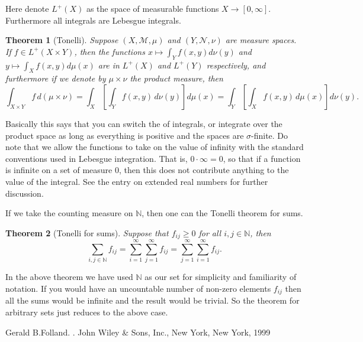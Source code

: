 \documentclass[12pt]{article}
\theoremstyle{theorem}
\newtheorem*{thm}{Theorem}
\theoremstyle{definition}
\theoremstyle{remark}
\begin{document}
Here denote $L^+(X)$ as the space of measurable functions $X \to [0,\infty]$.  Furthermore all integrals are Lebesgue integrals.

\begin{thm}[Tonelli]
Suppose $(X,{\mathcal{M}},\mu)$ and $(Y,{\mathcal{N}},\nu)$ are 
measure spaces.  If $f \in L^+(X \times Y)$, then the functions
$x \mapsto \int_Y f(x,y) d\nu(y)$ and
$y \mapsto \int_X f(x,y) d\mu(x)$ are in $L^+(X)$ and $L^+(Y)$ respectively, and furthermore if we denote by $\mu \times \nu$ the product measure, then
\begin{equation*}
\int_{X \times Y} f \, d(\mu \times \nu) =
\int_X \left[ \int_Y f(x,y) \,d\nu(y) \right] d\mu(x) = 
\int_Y \left[ \int_X f(x,y) \,d\mu(x) \right] d\nu(y) .
\end{equation*}
\end{thm} 

Basically this says that you can switch the  of integrals, or integrate over the product space as long as everything is positive and the spaces are $\sigma$-finite.  Do note that we allow the functions to take on the value of
infinity with the standard conventions used in Lebesgue integration.  That is, $0 \cdot \infty = 0$, so that if a function is infinite on a set of measure 0, then this does not contribute anything to the value of the integral.
See the entry on extended real numbers for further discussion.

If we take the counting measure on ${\mathbb{N}}$, then one can  the Tonelli theorem for sums.

\begin{thm}[Tonelli for sums]
Suppose that $f_{ij} \geq 0$ for all $i,j \in {\mathbb{N}}$, then
\begin{equation*}
\sum_{i,j \in {\mathbb{N}}} f_{ij}
=
\sum_{i=1}^\infty \sum_{j=1}^\infty f_{ij}
=
\sum_{j=1}^\infty \sum_{i=1}^\infty f_{ij} .
\end{equation*}
\end{thm}

In the above theorem we have used ${\mathbb{N}}$ as our  set for simplicity and familiarity of notation.  
If you would have an uncountable number of non-zero elements $f_{ij}$ then
all the sums would be infinite and the result would be trivial.
So the theorem for arbitrary 
sets just reduces to the above case.

\begin{thebibliography}{9}
Gerald B.\@ Folland. \emph{}. John Wiley \& Sons, Inc., New York, New York, 1999
\end{thebibliography}
\end{document}
